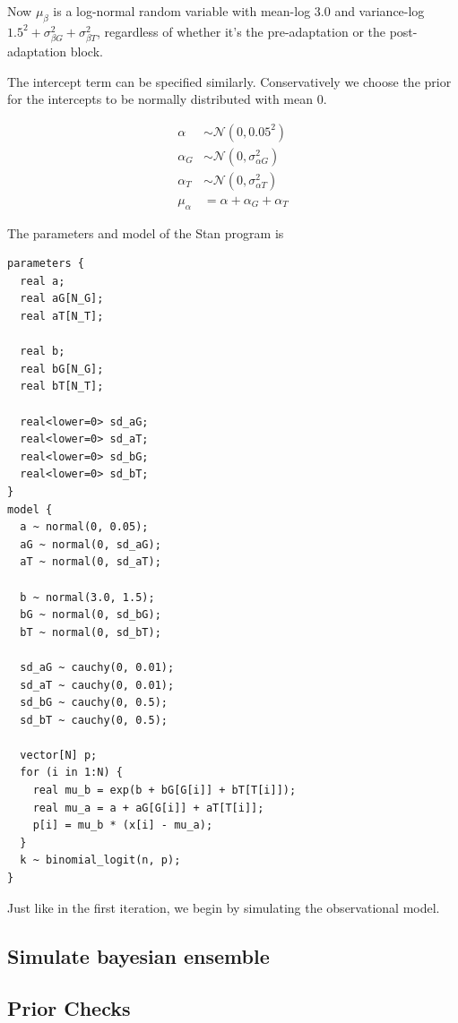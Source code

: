 \documentclass[11pt, oneside, openany]{scrbook}
\begin{document}
Now \(\mu_\beta\) is a log-normal random variable with mean-log \(3.0\) and variance-log \(1.5^2 + \sigma_{\beta G}^2 + \sigma_{\beta T}^2\), regardless of whether it's the pre-adaptation or the post-adaptation block.

The intercept term can be specified similarly. Conservatively we choose the prior for the intercepts to be normally distributed with mean 0.

\begin{align*}
\alpha &\sim \mathcal{N}(0, 0.05^2) \\
\alpha_G &\sim \mathcal{N}(0, \sigma_{\alpha G}^2) \\
\alpha_T &\sim \mathcal{N}(0, \sigma_{\alpha T}^2) \\
\mu_\alpha &= \alpha + \alpha_{G} + \alpha_{T}
\end{align*}

The parameters and model of the Stan program is

\begin{verbatim}
parameters {
  real a;
  real aG[N_G];
  real aT[N_T];
  
  real b;
  real bG[N_G];
  real bT[N_T];
  
  real<lower=0> sd_aG;
  real<lower=0> sd_aT;
  real<lower=0> sd_bG;
  real<lower=0> sd_bT;
}
model {
  a ~ normal(0, 0.05);
  aG ~ normal(0, sd_aG);
  aT ~ normal(0, sd_aT);
  
  b ~ normal(3.0, 1.5);
  bG ~ normal(0, sd_bG);
  bT ~ normal(0, sd_bT);
  
  sd_aG ~ cauchy(0, 0.01);
  sd_aT ~ cauchy(0, 0.01);
  sd_bG ~ cauchy(0, 0.5);
  sd_bT ~ cauchy(0, 0.5);
  
  vector[N] p;
  for (i in 1:N) {
    real mu_b = exp(b + bG[G[i]] + bT[T[i]]);
    real mu_a = a + aG[G[i]] + aT[T[i]];
    p[i] = mu_b * (x[i] - mu_a);
  }
  k ~ binomial_logit(n, p);
}
\end{verbatim}

Just like in the first iteration, we begin by simulating the observational model.

\hypertarget{iter2-sim}{%
\subsection{Simulate bayesian ensemble}\label{iter2-sim}}

\hypertarget{iter2-prior-check}{%
\subsection{Prior Checks}\label{iter2-prior-check}}
\end{document}
